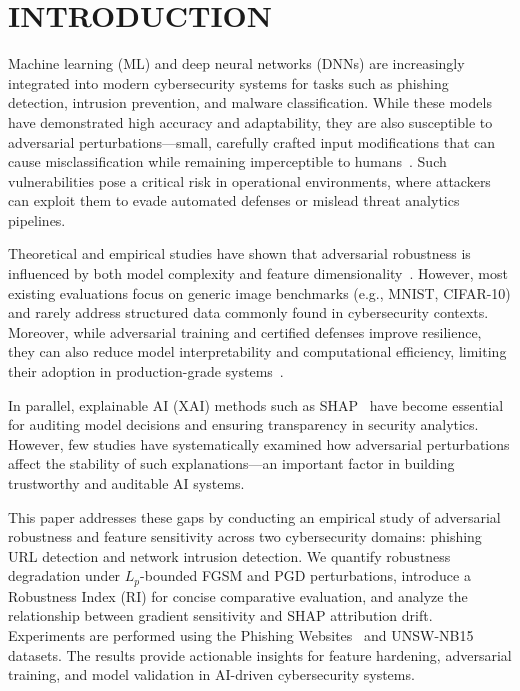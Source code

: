 \documentclass[a4paper,twoside]{article}
\begin{document}
\normalsize \setcounter{footnote}{0} \vfill

\section{\uppercase{Introduction}}
\label{sec:introduction}

Machine learning (ML) and deep neural networks (DNNs) are increasingly integrated into 
modern cybersecurity systems for tasks such as phishing detection, intrusion prevention, 
and malware classification. 
While these models have demonstrated high accuracy and adaptability, 
they are also susceptible to adversarial perturbations—small, carefully crafted input modifications 
that can cause misclassification while remaining imperceptible to humans~\cite{goodfellow2015explaining,biggio2013evasion}. 
Such vulnerabilities pose a critical risk in operational environments, 
where attackers can exploit them to evade automated defenses or mislead threat analytics pipelines.

Theoretical and empirical studies have shown that adversarial robustness is influenced by 
both model complexity and feature dimensionality~\cite{fawzi2018analysis,madry2018towards}. 
However, most existing evaluations focus on generic image benchmarks 
(e.g., MNIST, CIFAR-10) and rarely address structured data commonly found in 
cybersecurity contexts. 
Moreover, while adversarial training and certified defenses improve resilience, 
they can also reduce model interpretability and computational efficiency, 
limiting their adoption in production-grade systems~\cite{zhang2019theoretically,yang2020defending}.

In parallel, explainable AI (XAI) methods such as SHAP~\cite{lundberg2017unified} 
have become essential for auditing model decisions and ensuring transparency 
in security analytics. 
However, few studies have systematically examined how adversarial perturbations 
affect the stability of such explanations—an important factor in building 
trustworthy and auditable AI systems.

This paper addresses these gaps by conducting an empirical study of adversarial robustness 
and feature sensitivity across two cybersecurity domains: phishing URL detection 
and network intrusion detection. 
We quantify robustness degradation under $L_p$-bounded FGSM and PGD perturbations, 
introduce a Robustness Index (RI) for concise comparative evaluation, 
and analyze the relationship between gradient sensitivity and SHAP attribution drift. 
Experiments are performed using the Phishing Websites~\cite{phishing_kaggle} 
and UNSW-NB15~\cite{unsw_kaggle,moustafa2015unsw} datasets. 
The results provide actionable insights for feature hardening, adversarial training, 
and model validation in AI-driven cybersecurity systems.
\end{document}
